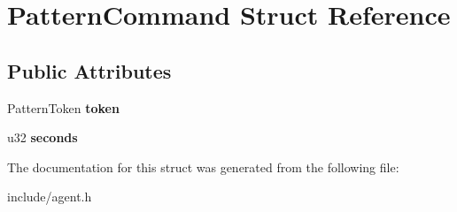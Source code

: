 \hypertarget{struct_pattern_command}{}\section{Pattern\+Command Struct Reference}
\label{struct_pattern_command}
\subsection*{Public Attributes}
\begin{DoxyCompactItemize}
\item 
\mbox{\label{struct_pattern_command_ab4e017f512d66adfaa4e71e0f6bec5fa}} 
Pattern\+Token {\bfseries token}
\item 
\mbox{\label{struct_pattern_command_a7d92efdc0b2533756387dcb6cddb6f19}} 
u32 {\bfseries seconds}
\end{DoxyCompactItemize}


The documentation for this struct was generated from the following file\+:\begin{DoxyCompactItemize}
\item 
include/agent.\+h\end{DoxyCompactItemize}
